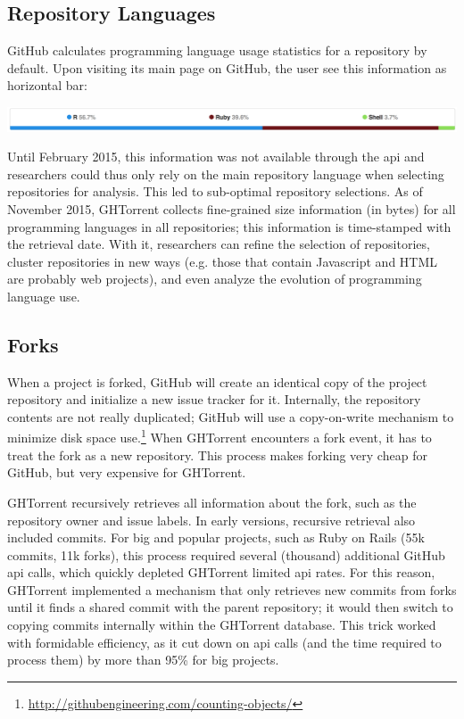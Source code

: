\documentclass{sig-alternate}
\begin{document}
\subsection{Repository Languages}
GitHub calculates programming language usage statistics for a
repository by default. Upon visiting its main page on GitHub, the user see this
information as horizontal bar:

\noindent\includegraphics[scale=0.243]{languages}

Until February 2015, this information was not available through the {\sc api}
and researchers could thus only rely on the main repository language when
selecting repositories for analysis. This led to sub-optimal repository
selections. As of November 2015, GHTorrent collects fine-grained size
information (in bytes) for all programming languages in all repositories; this
information is time-stamped with the retrieval date. With it,
researchers can refine the selection of repositories, cluster repositories in
new ways (e.g. those that contain Javascript and HTML are probably web
projects), and even analyze the evolution of programming language use.

\subsection{Forks}

When a project is forked, GitHub will create an identical copy of the project
repository and initialize a new issue tracker for it. Internally, the repository
contents are not really duplicated; GitHub will use a copy-on-write mechanism to
minimize disk space
use.\footnote{\url{http://githubengineering.com/counting-objects/}} When GHTorrent
encounters a fork event, it has to treat the fork as a new repository. This
process makes forking very cheap for GitHub, but very expensive for GHTorrent.

GHTorrent recursively retrieves all information about the fork, such as the
repository owner and issue labels. In early versions, recursive
retrieval also included commits. For big and popular projects, such as Ruby on
Rails (55k commits, 11k forks), this process required several (thousand)
additional GitHub {\sc api} calls, which quickly depleted GHTorrent limited {\sc
api} rates. For this reason, GHTorrent implemented a mechanism that only
retrieves new commits from forks until it finds a shared commit with the parent
repository; it would then switch to copying commits internally within the
GHTorrent database. This trick worked with formidable efficiency, as it cut down
on {\sc api} calls (and the time required to process them) by more than 95\% for
big projects.
\end{document}
